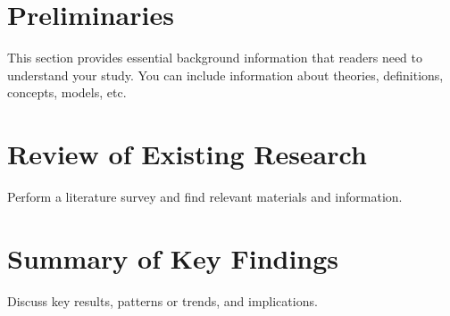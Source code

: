\section{Preliminaries}

This section provides essential background information that readers need to understand your study. You can include information about theories, definitions, concepts, models, etc.

\section{Review of Existing Research}
Perform a literature survey and find relevant materials and information.

\section{Summary of Key Findings}

Discuss key results, patterns or trends, and implications.
